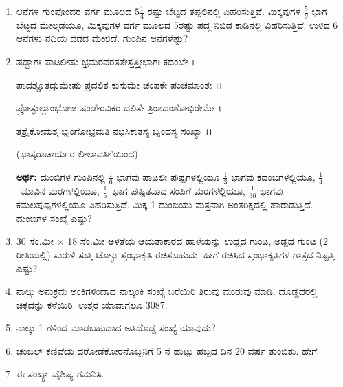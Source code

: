 \begin{enumerate}
\item ಆನೆಗಳ ಗುಂಪೊಂದರ ವರ್ಗ ಮೂಲದ $5\frac{1}{4}$ ರಷ್ಟು ಬೆಟ್ಟದ ತಪ್ಪಲಿನಲ್ಲಿ ವಿಹರಿಸುತ್ತಿವೆ. ಮಿಕ್ಕವುಗಳ $\frac{5}{9}$ ಭಾಗ ಬೆಟ್ಟದ ಮೇಲ್ಗಡೆಯೂ, ಮಿಕ್ಕವುಗಳ ವರ್ಗ ಮೂಲದ 5ರಷ್ಟು ಪದ್ಮ ನಿಬಿಡ ಕಾಡಿನಲ್ಲಿ ವಿಹರಿಸುತ್ತಿವೆ. ಉಳಿದ 6 ಆನೆಗಳು ನದಿಯ ದಡದ ಮೇಲಿದೆ. ಗುಂಪಿನ ಆನೆಗಳೆಷ್ಟು? 

\item ಷಡ್ಭಾಗಃ ಪಾಟಲೀಷು ಭ್ರಮರವರತತೇಸ್ತತ್ತ್ರೀಭಾಗಃ ಕದಂಬೇ ।

ಪಾದಶ್ಚೂತದ್ರುಮೇಷು ಪ್ರದಲಿತ ಕುಸುಮೇ ಚಂಪಕೇ ಪಂಚಮಾಂಶಃ ।।

ಪ್ರೋತ್ಫುಲ್ಲಾಂಭೋಜ ಷಂಡೇರವಿಕರ ದಲಿತೇ ತ್ರಿಂಶದಂಶೋಭಿರೇಮೇ । 

ತತ್ರೈಕೋಮತ್ತ ಭೃಂಗೋಭ್ರಮತಿ ನಭಸಿಕಾತಸ್ಯ ಬೃಂದಸ್ಯ ಸಂಖ್ಯಾ ।।

\smallskip
\hfill (ಭಾಸ್ಕರಾಚಾರ್ಯರ ಲೀಲಾವತೀ'ಯಿಂದ)

\smallskip
{\bf ಅರ್ಥ:} ದುಂಬಿಗಳ ಗುಂಪಿನಲ್ಲಿ $\frac{1}{6}$ ಭಾಗವು ಪಾಟಲೀ ಪುಷ್ಪಗಳಲ್ಲಿಯೂ $\frac{1}{3}$ ಭಾಗವು ಕದಂಬಗಳಲ್ಲಿಯೂ, $\frac{1}{4}$~ಮಾವಿನ ಮರಗಳಲ್ಲಿಯೂ, $\frac{1}{5}$~ಭಾಗ ಪುಷ್ಪಿತವಾದ ಸಂಪಿಗೆ \break ಮರಗಳಲ್ಲಿಯೂ, $\frac{1}{30}$ ಭಾಗವು ಕಮಲಪುಷ್ಪಗಳಲ್ಲಿಯೂ ವಿಹರಿಸುತ್ತಿದೆ. ಮಿಕ್ಕ 1 ದುಂಬಿಯು ಮತ್ತನಾಗಿ ಅಂತರಿಕ್ಷದಲ್ಲಿ ಹಾರಾಡುತ್ತಿದೆ. ದುಂಬಿಗಳ ಸಂಖ್ಯೆ ಎಷ್ಟು? 


\item 30 ಸೆಂ.ಮೀ $\times $ 18 ಸೆಂ.ಮೀ ಅಳತೆಯ ಆಯತಾಕಾರದ ಹಾಳೆಯನ್ನು ಉದ್ದದ ಗುಂಟ, ಅಡ್ಡದ ಗುಂಟ (2 ರೀತಿಯಲ್ಲಿ) ಸುರುಳಿ ಸುತ್ತಿ ಟೊಳ್ಳು ಸ್ತಂಭಾಕೃತಿ ರಚಿಸಬಹುದು. ಹೀಗೆ ರಚಿಸಿದ ಸ್ತಂಭಾಕೃತಿಗಳ ಗಾತ್ರದ ನಿಷ್ಪತ್ತಿ ಎಷ್ಟು? 

\item ನಾಲ್ಕು ಅನುಕ್ರಮ ಅಂಕಿಗಳಿಂದಾದ ನಾಲ್ಕಂಕಿ ಸಂಖ್ಯೆ ಬರೆಯಿರಿ ತಿರುವು ಮುರುವು ಮಾಡಿ. ದೊಡ್ಡದರಲ್ಲಿ ಚಿಕ್ಕದನ್ನು ಕಳೆಯಿರಿ. ಉತ್ತರ ಯಾವಾಗಲೂ 3087. 

\item ನಾಲ್ಕು 1 ಗಳಿಂದ ಮಾಡಬಹುದಾದ ಅತಿದೊಡ್ಡ ಸಂಖ್ಯೆ ಯಾವುದು? 

\item ಚಂಬಲ್ ಕಣಿವೆಯ ದರೋಡೆಕೋರನೊಬ್ಬನಿಗೆ 5 ನೆ ಹುಟ್ಟು ಹಬ್ಬದ ದಿನ 20 ವರ್ಷ ತುಂಬಿತು. ಹೇಗೆ 

\item ಈ ಸಂಖ್ಯಾ ವೈಶಿಷ್ಯ ಗಮನಿಸಿ. 


\end{enumerate}
